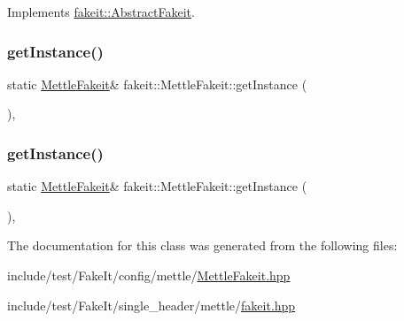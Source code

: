 Implements \mbox{\hyperlink{classfakeit_1_1AbstractFakeit_a9476180a503524d49d1978fbbc125b01}{fakeit\+::\+Abstract\+Fakeit}}.

\mbox{\label{classfakeit_1_1MettleFakeit_a41e07008725a0a812e0fc6b0c17b7d61}} 
\subsubsection{\texorpdfstring{getInstance()}{getInstance()}\hspace{0.1cm}{\footnotesize\ttfamily [1/2]}}
{\footnotesize\ttfamily static \mbox{\hyperlink{classfakeit_1_1MettleFakeit}{Mettle\+Fakeit}}\& fakeit\+::\+Mettle\+Fakeit\+::get\+Instance (\begin{DoxyParamCaption}{ }\end{DoxyParamCaption})\hspace{0.3cm}{\ttfamily [inline]}, {\ttfamily [static]}}

\mbox{\label{classfakeit_1_1MettleFakeit_a41e07008725a0a812e0fc6b0c17b7d61}} 
\subsubsection{\texorpdfstring{getInstance()}{getInstance()}\hspace{0.1cm}{\footnotesize\ttfamily [2/2]}}
{\footnotesize\ttfamily static \mbox{\hyperlink{classfakeit_1_1MettleFakeit}{Mettle\+Fakeit}}\& fakeit\+::\+Mettle\+Fakeit\+::get\+Instance (\begin{DoxyParamCaption}{ }\end{DoxyParamCaption})\hspace{0.3cm}{\ttfamily [inline]}, {\ttfamily [static]}}



The documentation for this class was generated from the following files\+:\begin{DoxyCompactItemize}
\item 
include/test/\+Fake\+It/config/mettle/\mbox{\hyperlink{MettleFakeit_8hpp}{Mettle\+Fakeit.\+hpp}}\item 
include/test/\+Fake\+It/single\+\_\+header/mettle/\mbox{\hyperlink{single__header_2mettle_2fakeit_8hpp}{fakeit.\+hpp}}\end{DoxyCompactItemize}
